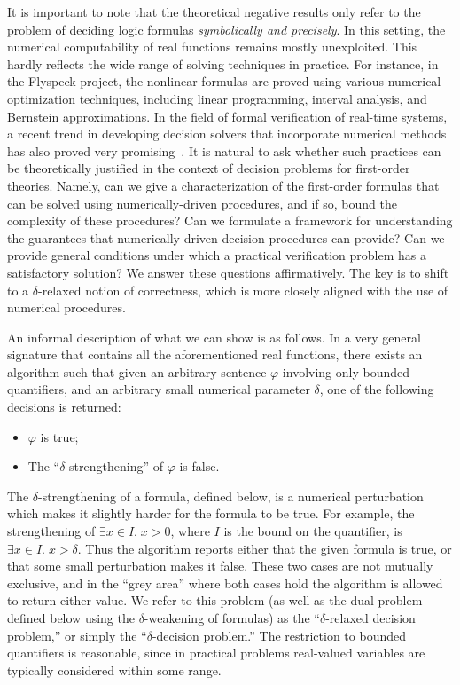 \documentclass[conference]{IEEEtran}
\begin{document}
It is important to note that the theoretical negative results only refer to the problem of deciding logic formulas {\em symbolically and precisely}. In this setting, the numerical computability of real functions remains mostly unexploited. This hardly reflects the wide range of solving techniques in practice. For instance, in the Flyspeck project, the nonlinear formulas are proved using various numerical optimization techniques, including linear programming, interval analysis, and Bernstein approximations. In the field of formal verification of real-time systems, a recent trend in developing decision solvers that incorporate numerical methods has also proved very promising~\cite{HySAT,AkbarpourP09,DBLP:conf/fmcad/Gao10,cordic}. It is natural to ask whether such practices can be theoretically justified in the context of decision problems for first-order theories. Namely, can we give a characterization of the first-order formulas that can be solved using numerically-driven procedures, and if so, bound the complexity of these procedures? Can we formulate a framework for understanding the guarantees that numerically-driven decision procedures can provide? Can we provide general conditions under which a practical verification problem has a satisfactory solution? We answer these questions affirmatively. The key is to shift to a $\delta$-relaxed notion of correctness, which is more closely aligned with the use of numerical procedures. 

An informal description of what we can show is as follows. In a very general signature that contains all the aforementioned real functions, there exists an algorithm such that given an arbitrary sentence $\varphi$ involving only bounded quantifiers, and an arbitrary small numerical parameter $\delta$, one of the following decisions is returned:
\begin{itemize}
\item $\varphi$ is true;
\item The ``$\delta$-strengthening'' of $\varphi$ is false. 
\end{itemize}
The $\delta$-strengthening of a formula, defined below, is a numerical perturbation which makes it slightly harder for the formula to be true. For example, the strengthening of $\exists x\in I. \; x>0$, where $I$ is the bound on the quantifier, is $\exists x\in I. \; x>\delta$. Thus the algorithm reports either that the given formula is true, or that some small perturbation makes it false. These two cases are not mutually exclusive, and in the ``grey area'' where both cases hold the algorithm is allowed to return either value. We refer to this problem (as well as the dual problem defined below using the $\delta$-weakening of formulas) as the ``$\delta$-relaxed decision problem,'' or simply the ``$\delta$-decision problem.'' The restriction to bounded quantifiers is reasonable, since in practical problems real-valued variables are typically considered within some range.  
\end{document}
